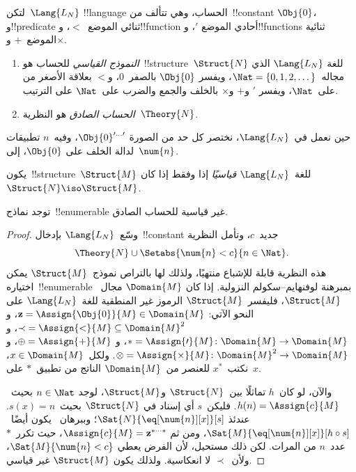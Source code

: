 \documentclass[../../../include/open-logic-section]{subfiles}
\begin{document}

\begin{defn}
لتكن~$\Lang{L_N}$ !!{language} الحساب، وهي تتألف من~!!{constant}
$\Obj{0}$، و!!{predicate} ثنائي الموضع~$<$، و!!{function} أحادي الموضع
$\prime$، و!!{function}s ثنائية الموضع~$+$ و$\times$.
\begin{enumerate}
\item \emph{النموذج القياسي} للحساب هو~!!{structure}~$\Struct{N}$ للغة
  $\Lang{L_N}$ الذي مجاله~$\Nat = \{ 0, 1, 2, \dots\}$، ويفسر
  $\Obj{0}$ بالصفر~$0$، و$<$ بعلاقة الأصغر من على~$\Nat$، ويفسر
  $\prime$ و$+$ و$\times$ بالخلف والجمع والضرب على~$\Nat$ على
  الترتيب.
\item \emph{الحساب الصادق} هو النظرية~$\Theory{N}$.
\end{enumerate}
\end{defn}

حين نعمل في~$\Lang{L_N}$، نختصر كل حد من الصورة
$\Obj{0}^{\prime\dots\prime}$، وفيه~$n$ تطبيقات لدالة الخلف على
$\Obj{0}$، إلى~$\num{n}$.

\begin{defn}
يكون~!!{structure}~$\Struct{M}$ للغة~$\Lang{L_N}$ \emph{قياسيًا} إذا
وفقط إذا كان~$\Struct{N} \iso \Struct{M}$.
\end{defn}

\begin{thm}
توجد نماذج~!!{enumerable} غير قياسية للحساب الصادق.
\end{thm}

\begin{proof}
وسّع~$\Lang{L_N}$ بإدخال~!!{constant} جديد~$c$، وتأمل النظرية
\[
\Theory{N} \cup \Setabs{\num{n} < c}{n \in \Nat}.
\]
هذه النظرية قابلة للإشباع منتهيًا، ولذلك لها بالتراص نموذج~$\Struct{M}$
يمكن اختياره~!!{enumerable} بمبرهنة لوفنهايم--سكولم النزولية. إذا كان
$\Domain{M}$ مجال~$\Struct{M}$، فليفسر~$\Struct{M}$ الرموز غير
المنطقية للغة~$\Lang{L_N}$ على النحو الآتي:
$\mathbf{z} = \Assign{\Obj{0}}{M} \in \Domain{M}$، و
${\prec} = \Assign{<}{M} \subseteq \Domain{M}^2$، و
$* = \Assign{\prime}{M} \colon \Domain{M} \to \Domain{M}$، و
$\oplus = \Assign{+}{M}$، و
$\otimes = \Assign{\times}{M} \colon \Domain{M}^2 \to \Domain{M}$.
ولكل~$x \in \Domain{M}$، نكتب~$x^*$ للعنصر من~$\Domain{M}$ الناتج من
تطبيق~$*$ على~$x$.

والآن، لو كان~$h$ تماثلًا بين~$\Struct{N}$ و$\Struct{M}$، لوجد
$n \in \Nat$ بحيث~$h(n) = \Assign{c}{M}$. فليكن~$s$ أي إسناد في
$\Struct{N}$ بحيث~$s(x) = n$. عندئذ
$\Sat{N}{\eq[\num{n}][x]}[s]$؛ وببرهان~ يكون
أيضًا~$\Sat{M}{\eq[\num{n}][x]}[h \circ s]$، ومن ثم
$\Assign{c}{M} = \mathbf{z}^{*\cdots *}$، حيث تكرر~$*$ عدد~$n$ من
المرات. لكن ذلك مستحيل، لأن الفرض يعطي
$\Sat{M}{\num{n} < c}$، ولأن~$\prec$ لا انعكاسية. ولذلك يكون
$\Struct{M}$ غير قياسي.
\end{proof}
\end{document}
